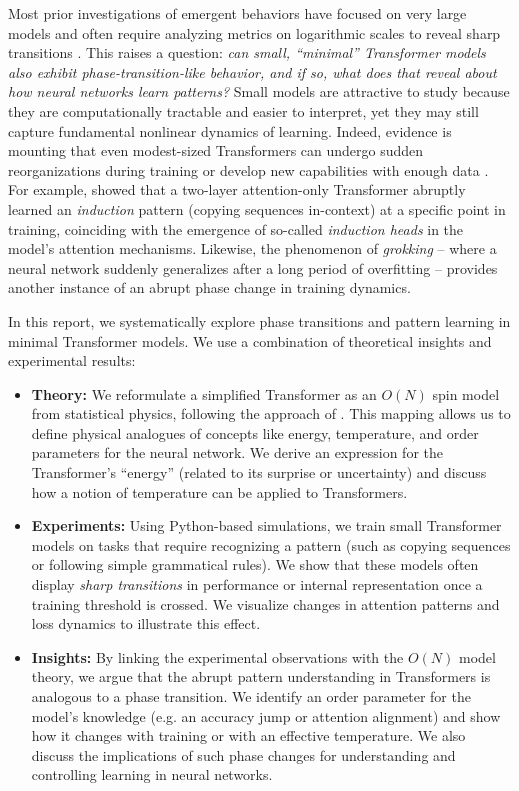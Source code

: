 \documentclass[12pt]{article}
\begin{document}
Most prior investigations of emergent behaviors have focused on very large models and often require analyzing metrics on logarithmic scales to reveal sharp transitions \citep{wei2022,hong2023}. This raises a question: \textit{can small, ``minimal'' Transformer models also exhibit phase-transition-like behavior, and if so, what does that reveal about how neural networks learn patterns?} Small models are attractive to study because they are computationally tractable and easier to interpret, yet they may still capture fundamental nonlinear dynamics of learning. Indeed, evidence is mounting that even modest-sized Transformers can undergo sudden reorganizations during training \citep{hong2023} or develop new capabilities with enough data \citep{olsson2022}. For example, \citet{olsson2022} showed that a two-layer attention-only Transformer abruptly learned an \emph{induction} pattern (copying sequences in-context) at a specific point in training, coinciding with the emergence of so-called \emph{induction heads} in the model's attention mechanisms. Likewise, the phenomenon of \emph{grokking} \citep{power2022} -- where a neural network suddenly generalizes after a long period of overfitting -- provides another instance of an abrupt phase change in training dynamics.

In this report, we systematically explore phase transitions and pattern learning in minimal Transformer models. We use a combination of theoretical insights and experimental results:
\begin{itemize}
    \item \textbf{Theory:} We reformulate a simplified Transformer as an $O(N)$ spin model from statistical physics, following the approach of \citet{sun2025}. This mapping allows us to define physical analogues of concepts like energy, temperature, and order parameters for the neural network. We derive an expression for the Transformer’s ``energy'' (related to its surprise or uncertainty) and discuss how a notion of temperature can be applied to Transformers.
    \item \textbf{Experiments:} Using Python-based simulations, we train small Transformer models on tasks that require recognizing a pattern (such as copying sequences or following simple grammatical rules). We show that these models often display \emph{sharp transitions} in performance or internal representation once a training threshold is crossed. We visualize changes in attention patterns and loss dynamics to illustrate this effect.
    \item \textbf{Insights:} By linking the experimental observations with the $O(N)$ model theory, we argue that the abrupt pattern understanding in Transformers is analogous to a phase transition. We identify an order parameter for the model’s knowledge (e.g. an accuracy jump or attention alignment) and show how it changes with training or with an effective temperature. We also discuss the implications of such phase changes for understanding and controlling learning in neural networks.
\end{itemize}
\end{document}

